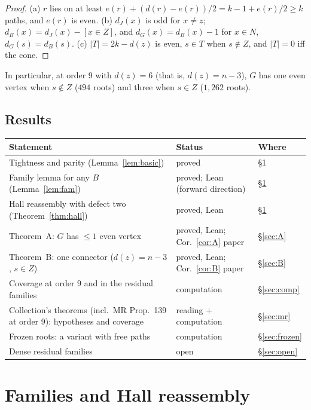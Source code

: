 \documentclass[11pt]{amsart}
\theoremstyle{definition}
\begin{document}
\begin{proof}
(a) $r$ lies on at least $e(r)+(d(r)-e(r))/2=k-1+e(r)/2\ge k$ paths, and $e(r)$ is even.
(b) $d_J(x)$ is odd for $x\ne z$; $d_B(x)=d_J(x)-[x\in Z]$, and $d_G(x)=d_B(x)-1$ for $x\in N$,
$d_G(s)=d_B(s)$. (c) $|T|=2k-d(z)$ is even, $s\in T$ when $s\notin Z$, and $|T|=0$ iff the cone.
\end{proof}

In particular, at order $9$ with $d(z)=6$ (that is, $d(z)=n-3$), $G$ has
one even vertex when $s\notin Z$ ($494$ roots) and three when $s\in Z$ ($1{,}262$ roots).

\subsection*{Results}
\begin{center}\small
\begin{tabular}{@{}>{\raggedright\arraybackslash}p{}>{\raggedright\arraybackslash}p{}p{}@{}}
\toprule
Statement & Status & Where\\
\midrule
Tightness and parity (Lemma~\ref{lem:basic}) & proved & \S1\\
Family lemma for any $B$ (Lemma~\ref{lem:fam}) & proved; Lean (forward direction) & \S\ref{sec:fam}\\
Hall reassembly with defect two (Theorem~\ref{thm:hall}) & proved, Lean & \S\ref{sec:fam}\\
Theorem~A: $G$ has $\le1$ even vertex & proved, Lean; Cor.~\ref{cor:A} paper & \S\ref{sec:A}\\
Theorem~B: one connector ($d(z)=n-3$, $s\in Z$) & proved, Lean; Cor.~\ref{cor:B} paper & \S\ref{sec:B}\\
Coverage at order $9$ and in the residual families & computation & \S\ref{sec:comp}\\
Collection's theorems (incl.\ MR Prop.~139 at order 9): hypotheses and coverage & reading + computation & \S\ref{sec:mr}\\
Frozen roots: a variant with free paths & computation & \S\ref{sec:frozen}\\
Dense residual families & open & \S\ref{sec:open}\\
\bottomrule
\end{tabular}
\end{center}

\section{Families and Hall reassembly}\label{sec:fam}
\end{document}
